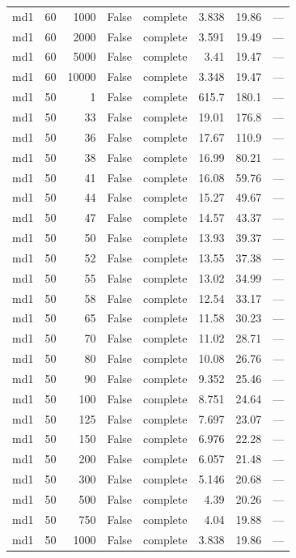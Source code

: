 \begin{tabular}{lrrrlrrl}
md1 & 60 & 1000 & False & complete & 3.838 & 19.86 & — \\
md1 & 60 & 2000 & False & complete & 3.591 & 19.49 & — \\
md1 & 60 & 5000 & False & complete & 3.41 & 19.47 & — \\
md1 & 60 & 10000 & False & complete & 3.348 & 19.47 & — \\
md1 & 50 & 1 & False & complete & 615.7 & 180.1 & — \\
md1 & 50 & 33 & False & complete & 19.01 & 176.8 & — \\
md1 & 50 & 36 & False & complete & 17.67 & 110.9 & — \\
md1 & 50 & 38 & False & complete & 16.99 & 80.21 & — \\
md1 & 50 & 41 & False & complete & 16.08 & 59.76 & — \\
md1 & 50 & 44 & False & complete & 15.27 & 49.67 & — \\
md1 & 50 & 47 & False & complete & 14.57 & 43.37 & — \\
md1 & 50 & 50 & False & complete & 13.93 & 39.37 & — \\
md1 & 50 & 52 & False & complete & 13.55 & 37.38 & — \\
md1 & 50 & 55 & False & complete & 13.02 & 34.99 & — \\
md1 & 50 & 58 & False & complete & 12.54 & 33.17 & — \\
md1 & 50 & 65 & False & complete & 11.58 & 30.23 & — \\
md1 & 50 & 70 & False & complete & 11.02 & 28.71 & — \\
md1 & 50 & 80 & False & complete & 10.08 & 26.76 & — \\
md1 & 50 & 90 & False & complete & 9.352 & 25.46 & — \\
md1 & 50 & 100 & False & complete & 8.751 & 24.64 & — \\
md1 & 50 & 125 & False & complete & 7.697 & 23.07 & — \\
md1 & 50 & 150 & False & complete & 6.976 & 22.28 & — \\
md1 & 50 & 200 & False & complete & 6.057 & 21.48 & — \\
md1 & 50 & 300 & False & complete & 5.146 & 20.68 & — \\
md1 & 50 & 500 & False & complete & 4.39 & 20.26 & — \\
md1 & 50 & 750 & False & complete & 4.04 & 19.88 & — \\
md1 & 50 & 1000 & False & complete & 3.838 & 19.86 & — \\

\end{tabular}
